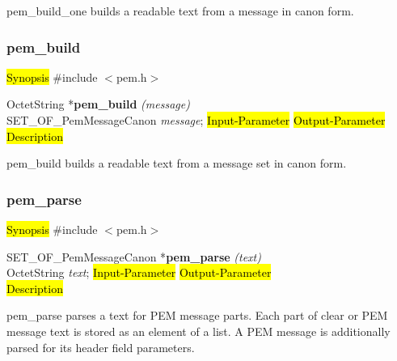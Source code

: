 pem\_build\_one builds a readable text from a message in canon form.









\subsubsection{pem\_build}
\label{pem_build}
\hl{Synopsis}
\#include $<$pem.h$>$ 

OctetString *{\bf pem\_build} {\em (message)} \\
SET\_OF\_PemMessageCanon {\em *message};
\hl{Input-Parameter}
\hl{Output-Parameter}
 \\
\hl{Description}

pem\_build builds a readable text from a message set in canon form.







\subsubsection{pem\_parse}
\label{pem_parse}
\hl{Synopsis}
\#include $<$pem.h$>$ 

SET\_OF\_PemMessageCanon *{\bf pem\_parse} {\em (text)} \\
OctetString {\em *text};
\hl{Input-Parameter}
\hl{Output-Parameter}
 \\
\hl{Description}

pem\_parse parses a text for PEM message parts. Each part of clear or
PEM message text is stored as an element of a list. A PEM message
is additionally parsed for its header field parameters.





